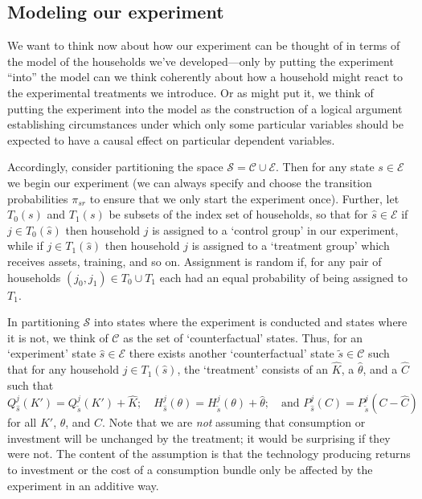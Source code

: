 \documentclass[11pt]{article}
\begin{document}
\subsection*{Modeling our experiment}
\label{sec-4-1}

We want to think now about how our experiment can be thought of in
terms of the model of the households we've developed---only by putting
the experiment ``into'' the model can we think coherently about how a
household might react to the experimental treatments we introduce.  Or
as \cite{Rubin74} might put it, we think of putting the experiment
into the model as the construction of a logical argument establishing
circumstances under which only some particular variables should be
expected to have a causal effect on particular dependent variables.

Accordingly, consider partitioning the space
$\mathcal{S}=\mathcal{C}\cup\mathcal{E}$.  Then for any state
$s\in\mathcal{E}$ we begin our experiment (we can always specify
 and choose the transition probabilities $\pi_{sr}$ to
ensure that we only start the experiment once).  Further, let $T_0(s)$
and $T_1(s)$ be subsets of the index set of households, so that for
$\hat s\in\mathcal{E}$ if $j\in T_0(\hat s)$ then household \(j\) is
assigned to a `control group' in our experiment, while if $j\in
T_1(\hat s)$ then household \(j\) is assigned to a `treatment group'
which receives assets, training, and so on.  Assignment is random if,
for any pair of households $(j_0,j_1)\in T_0\cup T_1$ each had an
equal probability of being assigned to $T_1$.

In partitioning $\mathcal{S}$ into states where the experiment is
conducted and states where it is not, we think of $\mathcal{C}$ as the
set of `counterfactual' states.  Thus, for an `experiment' state $\hat
s\in\mathcal{E}$ there exists another `counterfactual' state $\tilde s\in\mathcal{C}$
such that for any household $j\in T_1(\hat s)$, the `treatment'
consists of an $\hat K$, a $\hat\theta$, and a $\hat C$ such that
\begin{equation}
\label{eq:treatment_counterfactual}
   Q^j_{\hat s}(K') =    Q^j_{\tilde s}(K') + \hat K; \quad
   H^j_{\hat s}(\theta) = H^j_{\tilde s}(\theta) + \hat\theta;\quad
   \text{and $P^j_{\hat s}(C) = P^j_{\tilde s}(C-\hat C)$}
\end{equation}
for all $K'$, $\theta$, and $C$. Note that we are \emph{not} assuming
that consumption or investment will be unchanged by the treatment; it
would be surprising if they were not.  The content of the assumption
is that the technology producing returns to investment or the cost of
a consumption bundle only be affected by the experiment in an additive
way.  
\end{document}
